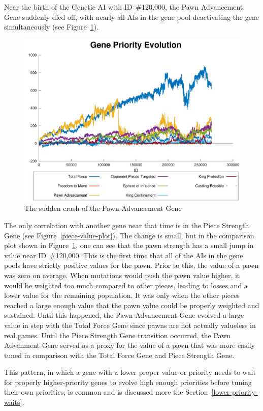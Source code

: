\documentclass[letterpaper]{article}
\renewcommand{\_}{\allowbreak\textunderscore\allowbreak}
\begin{document}
Near the birth of the Genetic AI with ID~\#120,000, the Pawn Advancement Gene suddenly died off, with nearly all AIs in the gene pool deactivating the gene simultaneously (see Figure~\ref{pawn-crash}).
\begin{figure}[htb]
	\centering
	\includegraphics[width=\textwidth]{pawn-advancement-crash}
	\caption{The sudden crash of the Pawn Advancement Gene}
	\label{pawn-crash}
\end{figure}

The only correlation with another gene near that time is in the Piece Strength Gene (see Figure~\ref{piece-value-plot}). The change is small, but in the comparison plot shown in Figure~\ref{pawn-crash}, one can see that the pawn strength has a small jump in value near ID~\#120,000. This is the first time that all of the AIs in the gene pools have strictly positive values for the pawn. Prior to this, the value of a pawn was zero on average. When mutations would push the pawn value higher, it would be weighted too much compared to other pieces, leading to losses and a lower value for the remaining population. It was only when the other pieces reached a large enough value that the pawn value could be properly weighted and sustained. Until this happened, the Pawn Advancement Gene evolved a large value in step with the Total Force Gene since pawns are not actually valueless in real games. Until the Piece Strength Gene transition occurred, the Pawn Advanment Gene served as a proxy for the value of a pawn that was more easily tuned in comparison with the Total Force Gene and Piece Strength Gene. 

This pattern, in which a gene with a lower proper value or priority needs to wait for properly higher-priority genes to evolve high enough priorities before tuning their own priorities, is common and is discussed more the Section~\ref{lower-priority-waits}.
\end{document}
